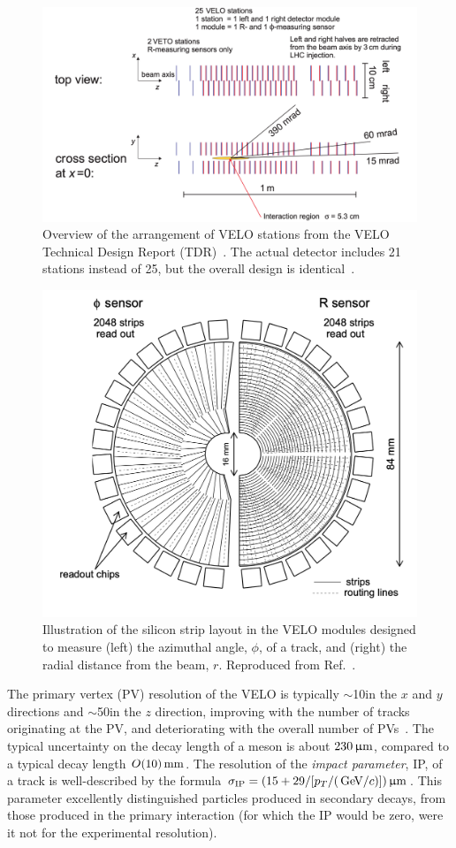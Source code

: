 \begin{figure}[tbp]
    \centering
    \includegraphics[width=0.95\columnwidth]{figures/detector/VELO_stations.png}
    \caption{Overview of the arrangement of VELO stations from the VELO Technical Design Report (TDR)~\cite{VELO-TDR}. The actual detector includes 21 stations instead of 25, but the overall design is identical~\cite{VELO-Performance}.}
    \label{fig:VELO_stations}
\end{figure}

\begin{figure}[tb]
    \centering
    \includegraphics[width=0.55\columnwidth]{figures/detector/VELO_sensors.png}
    \caption{Illustration of the silicon strip layout in the VELO modules designed to measure (left) the azimuthal angle, $\phi$, of a track, and (right) the radial distance from the beam, $r$. Reproduced from Ref.~\cite{VELO-TDR}.}
    \label{fig:VELO_sensors}
\end{figure}

The primary vertex (PV) resolution of the VELO is typically $\sim $10\mum in the $x$ and $y$ directions and $\sim$50\mum in the $z$ direction, improving with the number of tracks originating at the PV, and deteriorating with the overall number of PVs~\cite{VELO-Performance}. The typical uncertainty on the decay length of a \B meson is about $230\,\upmu\text{m}$, compared to a typical decay length$~O(10)\text{\,mm}$. The resolution of the \emph{impact parameter}, IP, of a track is well-described by the formula $\sigma_\mathrm{IP}=(15+29/[p_T/(\text{\,Ge\kern -0.1em V}/c)])\,\upmu\text{m}$. This parameter excellently distinguished particles produced in secondary decays, from those produced in the primary interaction (for which the IP would be zero, were it not for the experimental resolution).

